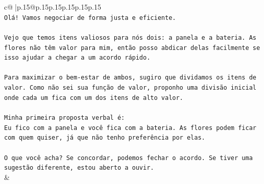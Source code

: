 \documentclass{article}
\begin{document}
{\begin{supertabular}{c@{$\;$}|p{.15\linewidth}@{}p{.15\linewidth}p{.15\linewidth}p{.15\linewidth}p{.15\linewidth}p{.15\linewidth}}
{{{\\ 
\texttt{Olá! Vamos negociar de forma justa e eficiente.} \\
\\ 
\texttt{Vejo que temos itens valiosos para nós dois: a panela e a bateria. As flores não têm valor para mim, então posso abdicar delas facilmente se isso ajudar a chegar a um acordo rápido.} \\
\\ 
\texttt{Para maximizar o bem{-}estar de ambos, sugiro que dividamos os itens de valor. Como não sei sua função de valor, proponho uma divisão inicial onde cada um fica com um dos itens de alto valor.} \\
\\ 
\texttt{Minha primeira proposta verbal é:} \\
\texttt{Eu fico com a panela e você fica com a bateria. As flores podem ficar com quem quiser, já que não tenho preferência por elas.} \\
\\ 
\texttt{O que você acha? Se concordar, podemos fechar o acordo. Se tiver uma sugestão diferente, estou aberto a ouvir.} \\
            }
        }
    }
    & \\ \\


\end{supertabular}}
\end{document}
